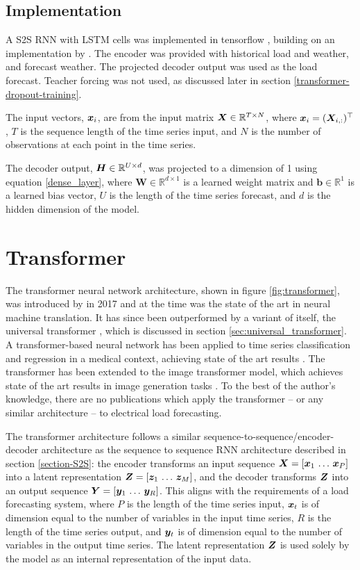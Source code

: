 \subsection{Implementation}
A S2S RNN with LSTM cells was implemented in tensorflow \cite{tensorflow2015-whitepaper}, building on an implementation by \citet{Chevalier2017}.
The encoder was provided with historical load and weather, and forecast weather.
The projected decoder output was used as the load forecast.
Teacher forcing was not used, as discussed later in section \ref{transformer-dropout-training}.

The input vectors, ${\bm{x}}_i$, are from the input matrix ${\bm{X}} \in \mathbb{R}^{T \times N}$, where ${\bm{x}}_i = ({\bm{X}}_{i,:})^\top$, $T$ is the sequence length of the time series input, and $N$ is the number of observations at each point in the time series.

The decoder output, ${\bm{H}} \in \mathbb{R}^{U \times d}$, was projected to a dimension of 1 using equation \ref{dense_layer}, where $\boldsymbol{W} \in \mathbb{R}^{d \times 1}$ is a learned weight matrix and $\boldsymbol{b} \in \mathbb{R}^{1}$ is a learned bias vector, $U$ is the length of the time series forecast, and $d$ is the hidden dimension of the model.

\section{Transformer} \label{sec:transformer}
The transformer neural network architecture, shown in figure \ref{fig:transformer}, was introduced by \citet{Vaswani2017} in 2017 and at the time was the state of the art in neural machine translation.
It has since been outperformed by a variant of itself, the universal transformer \cite{Dehghani2018}, which is discussed in section \ref{sec:universal_transformer}.
A transformer-based neural network has been applied to time series classification and regression in a medical context, achieving state of the art results \cite{Song2017}.
The transformer has been extended to the image transformer model, which achieves state of the art results in image generation tasks \cite{Parmar2018}.
To the best of the author's knowledge, there are no publications which apply the transformer -- or any similar architecture -- to electrical load forecasting.

The transformer architecture follows a similar sequence-to-sequence/encoder-decoder architecture as the sequence to sequence RNN architecture described in section \ref{section-S2S}: the encoder transforms an input sequence ${\bm{X}} = [{\bm{x}}_1 \, \ldots \, {\bm{x}}_P]$ into a latent representation ${\bm{Z}} = [{\bm{z}}_1 \, \ldots \, {\bm{z}}_M]$, and the decoder transforms ${\bm{Z}}$ into an output sequence ${\bm{Y}} = [{\bm{y}}_1 \, \ldots \, {\bm{y}}_R]$.
This aligns with the requirements of a load forecasting system, where $P$ is the length of the time series input, ${\bm{x}}_t$ is of dimension equal to the number of variables in the input time series, $R$ is the length of the time series output, and ${\bm{y}}_t$ is of dimension equal to the number of variables in the output time series.
The latent representation ${\bm{Z}}$ is used solely by the model as an internal representation of the input data.

